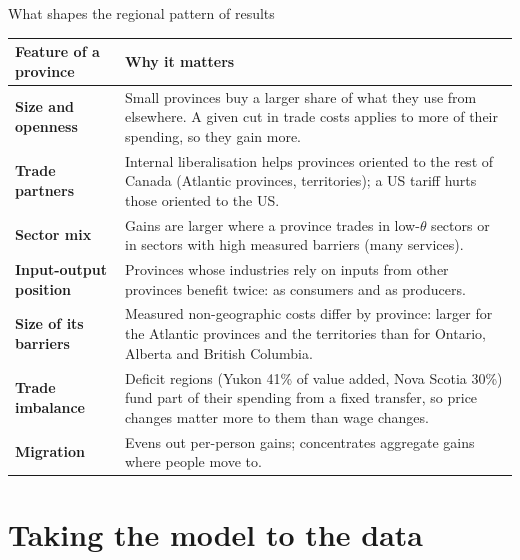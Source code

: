 \documentclass[aspectratio=169,9pt,t]{beamer}
\begin{document}
\begin{frame}{What shapes the regional pattern of results}
  \small
  \begin{tabular}{@{}L{0.27\textwidth}L{0.68\textwidth}@{}}
    \toprule
    Feature of a province & Why it matters\\
    \midrule
    \textbf{Size and openness} & Small provinces buy a larger share of what
      they use from elsewhere. A given cut in trade costs applies to more of
      their spending, so they gain more.\\
    \addlinespace
    \textbf{Trade partners} & Internal liberalisation helps provinces
      oriented to the rest of Canada (Atlantic provinces, territories); a US
      tariff hurts those oriented to the US.\\
    \addlinespace
    \textbf{Sector mix} & Gains are larger where a province trades in
      low-$\theta$ sectors or in sectors with high measured barriers
      (many services).\\
    \addlinespace
    \textbf{Input-output position} & Provinces whose industries rely on
      inputs from other provinces benefit twice: as consumers and as
      producers.\\
    \addlinespace
    \textbf{Size of its barriers} & Measured non-geographic costs differ by
      province: larger for the Atlantic provinces and the territories than
      for Ontario, Alberta and British Columbia.\\
    \addlinespace
    \textbf{Trade imbalance} & Deficit regions (Yukon 41\% of value added,
      Nova Scotia 30\%) fund part of their spending from a fixed transfer,
      so price changes matter more to them than wage changes.\\
    \addlinespace
    \textbf{Migration} & Evens out per-person gains; concentrates
      aggregate gains where people move to.\\
    \bottomrule
  \end{tabular}
\end{frame}

\section{Taking the model to the data}
\end{document}
